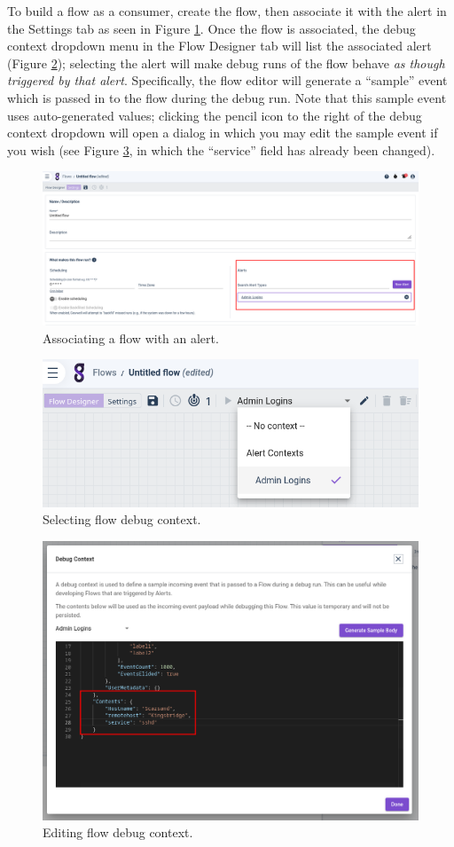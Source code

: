 To build a flow as a consumer, create the flow, then associate it with the alert in the Settings tab as seen in Figure \ref{fig:flow-alert}. Once the flow is associated, the debug context dropdown menu in the Flow Designer tab will list the associated alert (Figure \ref{fig:flow-context}); selecting the alert will make debug runs of the flow behave \emph{as though triggered by that alert}. Specifically, the flow editor will generate a ``sample'' event which is passed in to the flow during the debug run. Note that this sample event uses auto-generated values; clicking the pencil icon to the right of the debug context dropdown will open a dialog in which you may edit the sample event if you wish (see Figure \ref{fig:context-edit}, in which the ``service'' field has already been changed).

\begin{figure}
	\includegraphics[width=0.8\linewidth]{images/flow-alert.png}
	\caption{Associating a flow with an alert.}
	\label{fig:flow-alert}
\end{figure}

\begin{figure}
	\includegraphics[width=0.8\linewidth]{images/flow-context.png}
	\caption{Selecting flow debug context.}
	\label{fig:flow-context}
\end{figure}

\begin{figure}
	\includegraphics[width=0.8\linewidth]{images/context-edit.png}
	\caption{Editing flow debug context.}
	\label{fig:context-edit}
\end{figure}


